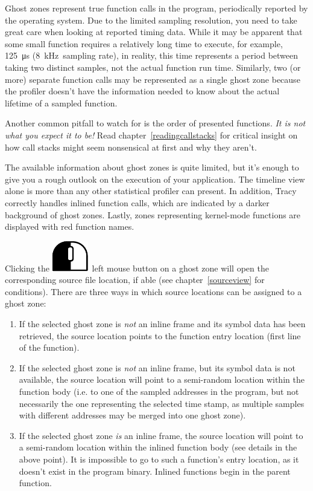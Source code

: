 \documentclass[hidelinks,titlepage,a4paper]{article}
\newcommand{\LMB}{\includegraphics[height=.8\baselineskip]{icons/lmb}}
\begin{document}
Ghost zones represent true function calls in the program, periodically reported by the operating system. Due to the limited sampling resolution, you need to take great care when looking at reported timing data. While it may be apparent that some small function requires a relatively long time to execute, for example, 125~\si{\micro\second} (8~kHz~sampling rate), in reality, this time represents a period between taking two distinct samples, not the actual function run time. Similarly, two (or more) separate function calls may be represented as a single ghost zone because the profiler doesn't have the information needed to know about the actual lifetime of a sampled function.

Another common pitfall to watch for is the order of presented functions. \emph{It is not what you expect it to be!} Read chapter~\ref{readingcallstacks} for critical insight on how call stacks might seem nonsensical at first and why they aren't.

The available information about ghost zones is quite limited, but it's enough to give you a rough outlook on the execution of your application. The timeline view alone is more than any other statistical profiler can present. In addition, Tracy correctly handles inlined function calls, which are indicated by a darker background of ghost zones. Lastly, zones representing kernel-mode functions are displayed with red function names.

Clicking the \LMB{}~left mouse button on a ghost zone will open the corresponding source file location, if able (see chapter~\ref{sourceview} for conditions). There are three ways in which source locations can be assigned to a ghost zone:

\begin{enumerate}
\item If the selected ghost zone is \emph{not} an inline frame and its symbol data has been retrieved, the source location points to the function entry location (first line of the function).
\item If the selected ghost zone is \emph{not} an inline frame, but its symbol data is not available, the source location will point to a semi-random location within the function body (i.e. to one of the sampled addresses in the program, but not necessarily the one representing the selected time stamp, as multiple samples with different addresses may be merged into one ghost zone).
\item If the selected ghost zone \emph{is} an inline frame, the source location will point to a semi-random location within the inlined function body (see details in the above point). It is impossible to go to such a function's entry location, as it doesn't exist in the program binary. Inlined functions begin in the parent function.
\end{enumerate}
\end{document}
